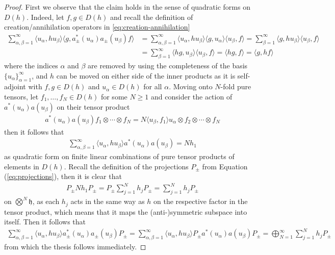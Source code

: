 \begin{proof}
	First we observe that the claim holds in the sense of quadratic forms on $D(h)$. Indeed,
	let $f,g \in D(h)$ and recall the definition of creation/annihilation operators in
	\ref{eq:creation-annihilation}
	\begin{align*}
		\sum_{\alpha,\beta=1}^\infty \langle u_\alpha,h u_\beta\rangle \langle g,a^*_\pm(u_\alpha)a_\pm(u_\beta)f\rangle
		&= \sum_{\alpha,\beta=1}^\infty \langle u_\alpha,h u_\beta\rangle\langle g,u_\alpha\rangle\langle u_\beta,f\rangle
		= \sum_{\beta=1}^\infty \langle g,h u_\beta\rangle\langle u_\beta,f\rangle \\
		&= \sum_{\beta=1}^\infty \langle h g, u_\beta\rangle\langle u_\beta,f\rangle
		= \langle h g,f \rangle = \langle g,h f\rangle
	\end{align*}
	where the indices $\alpha$ and $\beta$ are removed by using the completeness of the basis
	$\{u_\alpha\}_{\alpha=1}^\infty$, and $h$ can be moved on either side of the inner products
	as it is self-adjoint with $f,g\in D(h)$ and $u_\alpha\in D(h)$ for all $\alpha$.
	Moving onto $N$-fold pure tensors, let $f_1,\ldots,f_N\in D(h)$ for some $N\geq1$ and
	consider the action of $a^*(u_\alpha)a(u_\beta)$ on their tensor product
	\begin{align*}
		a^*(u_\alpha)a(u_\beta)f_1\otimes\cdots\otimes f_N=N\langle u_\beta,f_1\rangle u_\alpha\otimes f_2\otimes\cdots\otimes f_N
	\end{align*}
	then it follows that
	\begin{align*}
		\sum_{\alpha,\beta=1}^\infty\langle u_\alpha,h u_\beta\rangle a^*(u_\alpha)a(u_\beta)
		= N h_1
	\end{align*}
	as quadratic form on finite linear combinations of pure tensor products of elements in $D(h)$.
	Recall the definition of the projections $P_\pm$ from Equation (\ref{eq:projections}),
	then it is clear that
	\begin{align*}
		P_\pm Nh_1P_\pm = P_\pm\sum_{j=1}^N h_jP_\pm = \sum_{j=1}^N h_jP_\pm
	\end{align*}
	on $\bigotimes^N\mathfrak{h}$, as each $h_j$ acts in the same way as $h$ on the respective
	factor in the tensor product, which means that it maps the (anti-)symmetric subspace into
	itself. Then it follows that
	\begin{align*}
		\sum_{\alpha,\beta=1}^\infty\langle u_\alpha,h u_\beta\rangle a^*_\pm(u_\alpha)a_\pm(u_\beta) P_\pm
		= \sum_{\alpha,\beta=1}^\infty\langle u_\alpha,h u_\beta\rangle P_\pm a^*(u_\alpha)a(u_\beta) P_\pm
		= \bigoplus_{N=1}^\infty\sum_{j=1}^N h_j P_\pm
	\end{align*}
	from which the thesis follows immediately.
\end{proof}

